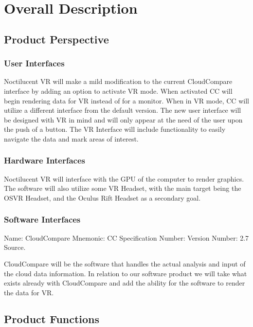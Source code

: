 \documentclass{article}
\begin{document}
\section{Overall Description}
\subsection{Product Perspective}

\subsubsection{User Interfaces}

Noctilucent VR will make a mild modification to the current CloudCompare interface by adding an option to activate VR mode. 
When activated CC will begin rendering data for VR instead of for a monitor.
When in VR mode, CC will utilize a different interface from the default version.
The new user interface will be designed with VR in mind and will only appear at the need of the user upon the push of a button.
The VR Interface will include functionality to easily navigate the data and mark areas of interest.

\subsubsection{Hardware Interfaces}

Noctilucent VR will interface with the GPU of the computer to render graphics.
The software will also utilize some VR Headset, with the main target being the
OSVR Headset, and the Oculus Rift Headset as a secondary goal.

\subsubsection{Software Interfaces}

Name: CloudCompare
Mnemonic: CC
Specification Number:
Version Number: 2.7
Source.

CloudCompare will be the software that handles the actual analysis and input of the cloud data information. 
In relation to our software product we will take what exists already with CloudCompare and add the ability for the software to render the data for VR.

\subsection{Product Functions}
\end{document}
